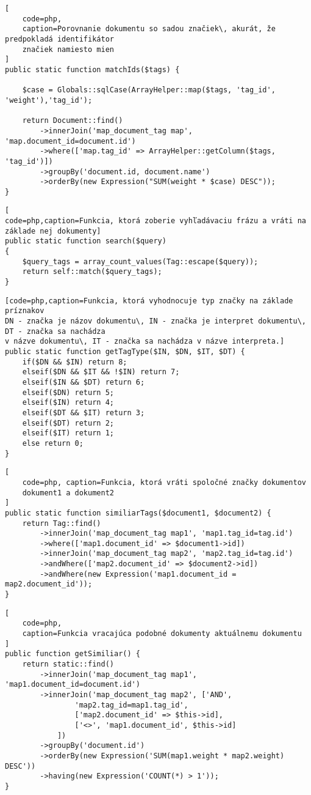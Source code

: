 \begin{lstlisting}[
    code=php,
    caption=Porovnanie dokumentu so sadou značiek\, akurát, že predpokladá identifikátor
    značiek namiesto mien
]
public static function matchIds($tags) {

    $case = Globals::sqlCase(ArrayHelper::map($tags, 'tag_id', 'weight'),'tag_id');

    return Document::find()
        ->innerJoin('map_document_tag map', 'map.document_id=document.id')
        ->where(['map.tag_id' => ArrayHelper::getColumn($tags, 'tag_id')])
        ->groupBy('document.id, document.name')
        ->orderBy(new Expression("SUM(weight * $case) DESC"));
}
\end{lstlisting}

\begin{lstlisting}[
code=php,caption=Funkcia, ktorá zoberie vyhľadávaciu frázu a vráti na základe nej dokumenty]
public static function search($query)
{
    $query_tags = array_count_values(Tag::escape($query));
    return self::match($query_tags);
}
\end{lstlisting}

\begin{lstlisting}[code=php,caption=Funkcia, ktorá vyhodnocuje typ značky na základe príznakov
DN - značka je názov dokumentu\, IN - značka je interpret dokumentu\, DT - značka sa nachádza
v názve dokumentu\, IT - značka sa nachádza v názve interpreta.]
public static function getTagType($IN, $DN, $IT, $DT) {
    if($DN && $IN) return 8;
    elseif($DN && $IT && !$IN) return 7;
    elseif($IN && $DT) return 6;
    elseif($DN) return 5;
    elseif($IN) return 4;
    elseif($DT && $IT) return 3;
    elseif($DT) return 2;
    elseif($IT) return 1;
    else return 0;
}
\end{lstlisting}

\begin{lstlisting}[
    code=php, caption=Funkcia, ktorá vráti spoločné značky dokumentov
    dokument1 a dokument2
]
public static function similiarTags($document1, $document2) {
    return Tag::find()
        ->innerJoin('map_document_tag map1', 'map1.tag_id=tag.id')
        ->where(['map1.document_id' => $document1->id])
        ->innerJoin('map_document_tag map2', 'map2.tag_id=tag.id')
        ->andWhere(['map2.document_id' => $document2->id])
        ->andWhere(new Expression('map1.document_id = map2.document_id'));
}
\end{lstlisting}

\begin{lstlisting}[
    code=php,
    caption=Funkcia vracajúca podobné dokumenty aktuálnemu dokumentu
]
public function getSimiliar() {
    return static::find()
        ->innerJoin('map_document_tag map1', 'map1.document_id=document.id')
        ->innerJoin('map_document_tag map2', ['AND',
                'map2.tag_id=map1.tag_id',
                ['map2.document_id' => $this->id],
                ['<>', 'map1.document_id', $this->id]
            ])
        ->groupBy('document.id')
        ->orderBy(new Expression('SUM(map1.weight * map2.weight) DESC'))
        ->having(new Expression('COUNT(*) > 1'));
}
\end{lstlisting}

